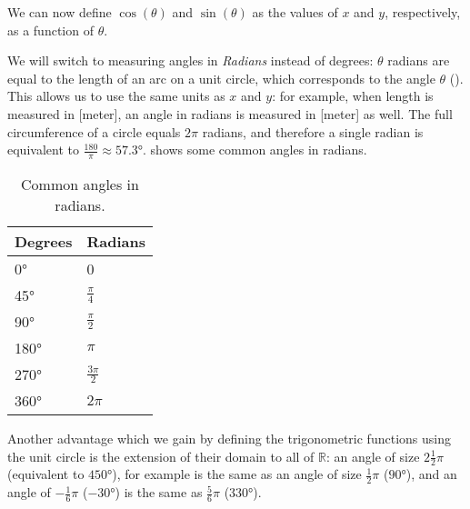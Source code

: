 We can now define $\cos(\theta)$ and $\sin(\theta)$ as the values of $x$ and $y$, respectively, as a function of $\theta$.

We will switch to measuring angles in \emph{Radians} instead of degrees: $\theta$ radians are equal to the length of an arc on a unit circle, which corresponds to the angle $\theta$ (). This allows us to use the same units as $x$ and $y$: for example, when length is measured in [\si{meter}], an angle in radians is measured in [\si{meter}] as well. The full circumference of a circle equals $2\pi$ radians, and therefore a single radian is equivalent to $\frac{180}{\pi} \approx \ang{57.3}$.  shows some common angles in radians.

\begin{table}
	\caption{Common angles in radians.}
	\label{tab:rad_degs}
	\centering
	\begin{tabular}{ll}
		\toprule
		Degrees & Radians \\
		\midrule
		\ang{0} & 0 \\
		\ang{45} & $\frac{\pi}{4}$ \\
		\ang{90} & $\frac{\pi}{2}$ \\
		\ang{180} & $\pi$ \\
		\ang{270} & $\frac{3\pi}{2}$ \\
		\ang{360} & $2\pi$ \\
		\bottomrule
	\end{tabular}
\end{table}

Another advantage which we gain by defining the trigonometric functions using the unit circle is the extension of their domain to all of $\mathbb{R}$: an angle of size $2\frac{1}{2}\pi$ (equivalent to $\ang{450}$), for example is the same as an angle of size $\frac{1}{2}\pi$ ($\ang{90}$), and an angle of $-\frac{1}{6}\pi$ ($-\ang{30}$) is the same as $\frac{5}{6}\pi$ ($\ang{330}$).

